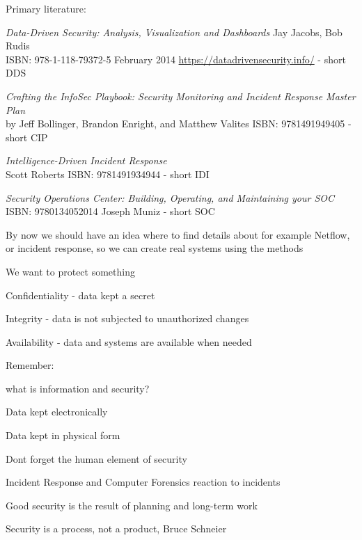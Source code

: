 \documentclass[Screen16to9,17pt]{foils}
\begin{document}
Primary literature:
\begin{list2}
\item \emph{Data-Driven Security: Analysis, Visualization and Dashboards} Jay Jacobs, Bob Rudis\\
ISBN: 978-1-118-79372-5 February 2014 \url{https://datadrivensecurity.info/} - short DDS
\item \emph{Crafting the InfoSec Playbook: Security Monitoring and Incident Response Master Plan}\\
 by Jeff Bollinger, Brandon Enright, and Matthew Valites ISBN: 9781491949405 - short CIP
\item \emph{Intelligence-Driven Incident Response} \\
 Scott Roberts ISBN: 9781491934944 - short IDI
\item \emph{Security Operations Center: Building, Operating, and Maintaining your SOC}\\
ISBN: 9780134052014 Joseph Muniz - short SOC
\end{list2}

By now we should have an idea where to find details about for example Netflow, or incident response, so we can create real systems using the methods



\begin{list1}
\item We want to protect something
\item Confidentiality - data kept a secret
\item Integrity - data is not subjected to unauthorized changes
\item Availability - data and systems are available when needed
\end{list1}



\begin{list1}
\item Remember:
\begin{list2}
\item what is information and security?
\item Data kept electronically
\item Data kept in physical form
\item Dont forget the human element of security
\end{list2}
\item Incident Response and Computer Forensics reaction to incidents
\item Good security is the result of planning and long-term work
\end{list1}
\vskip 1cm
\centerline{\color{titlecolor}\LARGE Security is a process, not a product, Bruce Schneier}
\end{document}
